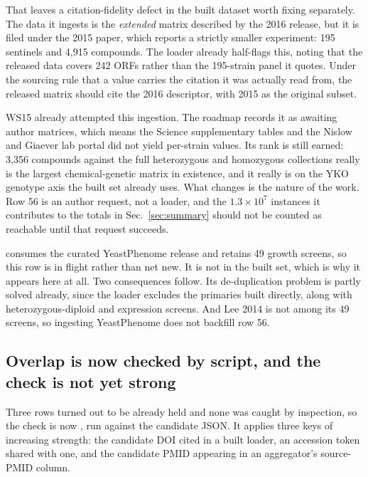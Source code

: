 That leaves a citation-fidelity defect in the built dataset worth fixing separately. The
data it ingests is the \emph{extended} matrix described by the 2016 release, but it is filed
under the 2015 paper, which reports a strictly smaller experiment: 195 sentinels and 4,915
compounds. The loader already half-flags this, noting that the released data covers 242 ORFs
rather than the 195-strain panel it quotes. Under the sourcing rule that a value carries the
citation it was actually read from, the released matrix should cite the 2016 descriptor, with
2015 as the original subset.

 WS15 already attempted this
ingestion. The roadmap records it as awaiting author matrices, which means the Science
supplementary tables and the Nislow and Giaever lab portal did not yield per-strain values.
Its rank is still earned: 3,356 compounds against the full heterozygous and homozygous
collections really is the largest chemical-genetic matrix in existence, and it really is on
the YKO genotype axis the built set already uses. What changes is the nature of the work.
Row 56 is an author request, not a loader, and the $1.3\times10^7$ instances it contributes
to the totals in Sec.~\ref{sec:summary} should not be counted as reachable until that
request succeeds.

 
consumes the curated YeastPhenome release and retains 49 growth screens, so this row is in
flight rather than net new. It is not in the built set, which is why it appears here at all.
Two consequences follow. Its de-duplication problem is partly solved already, since the
loader excludes the primaries built directly, along with heterozygous-diploid and
expression screens. And Lee 2014 is not among its 49 screens, so ingesting YeastPhenome
does not backfill row 56.

\subsection{Overlap is now checked by script, and the check is not yet strong}\label{sec:overlap}

Three rows turned out to be already held and none was caught by inspection, so the check is
now , run against the
candidate JSON. It applies three keys of increasing strength: the candidate DOI cited in a
built loader, an accession token shared with one, and the candidate PMID appearing in an
aggregator's source-PMID column.


